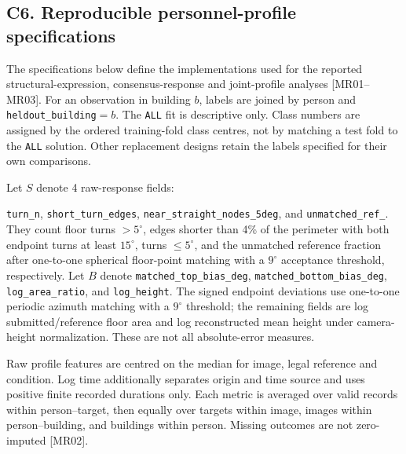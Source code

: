 \clearpage
\subsection*{C6. Reproducible personnel-profile specifications}
The specifications below define the implementations used for the reported
structural-expression, consensus-response and joint-profile analyses
[MR01--MR03]. For an observation in building
$b$, labels are joined by person and \texttt{heldout\_building}$=b$.
The \texttt{ALL} fit is descriptive only. Class numbers are assigned by the
ordered training-fold class centres, not by matching a test fold to the
\texttt{ALL} solution. Other replacement designs retain the labels specified
for their own comparisons.

Let $S$ denote 4 raw-response fields:
\begin{sloppypar}
\texttt{turn\_n}, \texttt{short\_turn\_edges},
\texttt{near\_\allowbreak straight\_\allowbreak nodes\_\allowbreak 5deg},
and \texttt{unmatched\_\allowbreak ref\_}.
They count floor turns $>5^\circ$, edges shorter than 4\% of the perimeter
with both endpoint turns at least $15^\circ$, turns $\leq5^\circ$, and the
unmatched reference fraction after one-to-one spherical floor-point matching
with a $9^\circ$ acceptance threshold, respectively.
Let $B$ denote \texttt{matched\_\allowbreak top\_\allowbreak bias\_\allowbreak deg},
\texttt{matched\_\allowbreak bottom\_\allowbreak bias\_\allowbreak deg}, \texttt{log\_area\_ratio}, and
\texttt{log\_height}. The signed endpoint deviations use one-to-one periodic
azimuth matching with a $9^\circ$ threshold; the remaining fields are log
submitted/reference floor area and log reconstructed mean height under
camera-height normalization. These are not all absolute-error measures.
\end{sloppypar}

Raw profile features are centred on the median for image, legal reference
and condition. Log time additionally separates origin and time source and
uses positive finite recorded durations only. Each metric is averaged over
valid records within person--target, then equally over targets within image,
images within person--building, and buildings within person. Missing
outcomes are not zero-imputed [MR02].

